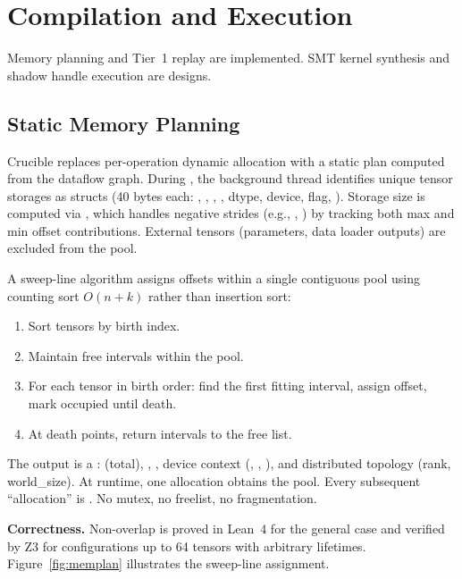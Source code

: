 
\section{Compilation and Execution}\label{sec:compilation}

Memory planning and Tier~1 replay are implemented.
SMT kernel synthesis and shadow handle execution are designs.

\subsection{Static Memory Planning}

Crucible replaces per-operation dynamic allocation with a static plan computed from the dataflow graph.
During , the background thread identifies unique tensor storages as  structs (40 bytes each: , , , , dtype, device,  flag, ).
Storage size is computed via , which handles negative strides (e.g., , ) by tracking both max and min offset contributions.
External tensors (parameters, data loader outputs) are excluded from the pool.

A sweep-line algorithm assigns offsets within a single contiguous pool using counting sort $O(n{+}k)$ rather than insertion sort:

\begin{enumerate}
  \item Sort tensors by birth index.
  \item Maintain free intervals within the pool.
  \item For each tensor in birth order: find the first fitting interval, assign offset, mark occupied until death.
  \item At death points, return intervals to the free list.
\end{enumerate}

The output is a :  (total), , , device context (, , ), and distributed topology (rank, world\_size).
At runtime, one allocation obtains the pool.
Every subsequent ``allocation'' is .
No mutex, no freelist, no fragmentation.

\textbf{Correctness.}
Non-overlap is proved in Lean~4 for the general case and verified by Z3 for configurations up to 64 tensors with arbitrary lifetimes.
Figure~\ref{fig:memplan} illustrates the sweep-line assignment.

